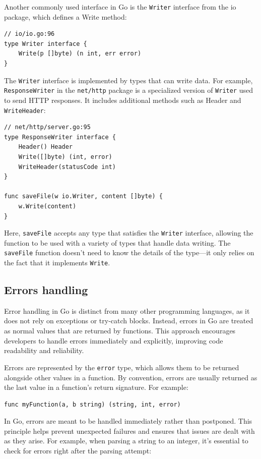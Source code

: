 Another commonly used interface in Go is the \texttt{Writer} interface from the io package, which defines a Write method:

\begin{verbatim}
// io/io.go:96
type Writer interface {
    Write(p []byte) (n int, err error)
}
\end{verbatim}
The \texttt{Writer} interface is implemented by types that can write data. For example, \texttt{ResponseWriter} in the \texttt{net/http} package is a specialized version of \texttt{Writer} used to send HTTP responses. It includes additional methods such as Header and \texttt{WriteHeader}:

\begin{verbatim}
// net/http/server.go:95
type ResponseWriter interface {
    Header() Header
    Write([]byte) (int, error)
    WriteHeader(statusCode int)
}

func saveFile(w io.Writer, content []byte) {
    w.Write(content)
}
\end{verbatim}
Here, \texttt{saveFile} accepts any type that satisfies the \texttt{Writer} interface, allowing the function to be used with a variety of types that handle data writing. The \texttt{saveFile} function doesn’t need to know the details of the type—it only relies on the fact that it implements \texttt{Write}.

\subsection*{Errors handling}
Error handling in Go is distinct from many other programming languages, as it does not rely on exceptions or try-catch blocks. Instead, errors in Go are treated as normal values that are returned by functions. This approach encourages developers to handle errors immediately and explicitly, improving code readability and reliability.

Errors are represented by the \texttt{error} type, which allows them to be returned alongside other values in a function. By convention, errors are usually returned as the last value in a function’s return signature. For example:

\begin{verbatim}
func myFunction(a, b string) (string, int, error)
\end{verbatim}

In Go, errors are meant to be handled immediately rather than postponed. This principle helps prevent unexpected failures and ensures that issues are dealt with as they arise. For example, when parsing a string to an integer, it’s essential to check for errors right after the parsing attempt:

